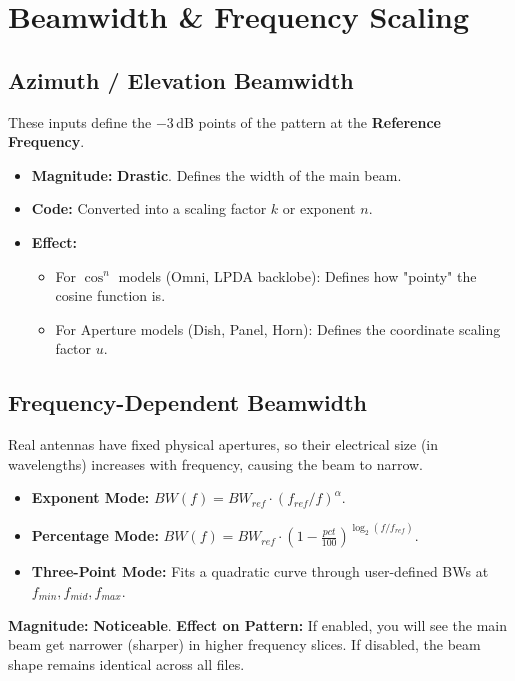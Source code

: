 \documentclass[11pt,a4paper]{article}
\begin{document}
\newpage
\section{Beamwidth \& Frequency Scaling}

\subsection{Azimuth / Elevation Beamwidth}
These inputs define the $-3$\,dB points of the pattern at the \textbf{Reference Frequency}.
\begin{itemize}
    \item \textbf{Magnitude:} \textbf{Drastic}. Defines the width of the main beam.
    \item \textbf{Code:} Converted into a scaling factor $k$ or exponent $n$.
    \item \textbf{Effect:}
    \begin{itemize}
        \item For $\cos^n$ models (Omni, LPDA backlobe): Defines how "pointy" the cosine function is.
        \item For Aperture models (Dish, Panel, Horn): Defines the coordinate scaling factor $u$.
    \end{itemize}
\end{itemize}

\subsection{Frequency-Dependent Beamwidth}
Real antennas have fixed physical apertures, so their electrical size (in wavelengths) increases with frequency, causing the beam to narrow.

\begin{itemize}
    \item \textbf{Exponent Mode:} $BW(f) = BW_{ref} \cdot (f_{ref} / f)^\alpha$.
    \item \textbf{Percentage Mode:} $BW(f) = BW_{ref} \cdot (1 - \frac{pct}{100})^{\log_2(f/f_{ref})}$.
    \item \textbf{Three-Point Mode:} Fits a quadratic curve through user-defined BWs at $f_{min}, f_{mid}, f_{max}$.
\end{itemize}

\textbf{Magnitude:} \textbf{Noticeable}.
\textbf{Effect on Pattern:}
If enabled, you will see the main beam get narrower (sharper) in higher frequency slices. If disabled, the beam shape remains identical across all files.
\end{document}
